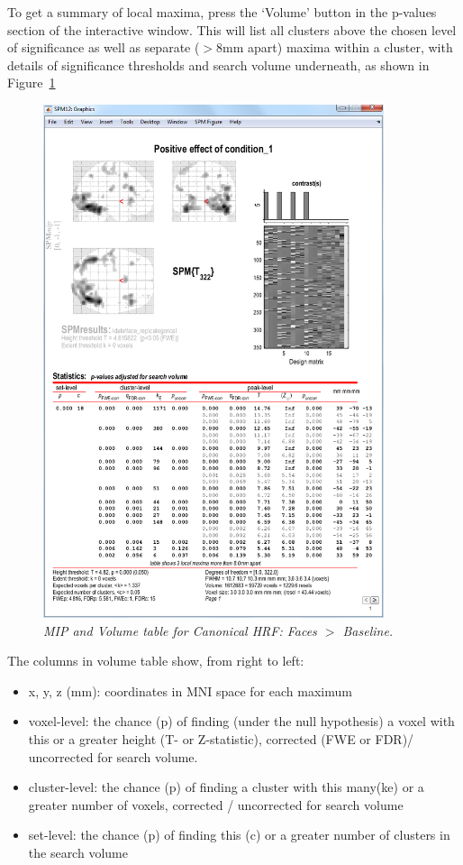 \documentclass[a4paper,titlepage]{book}
\newcommand{\bi}{\begin{itemize}}
\newcommand{\ei}{\end{itemize}}
\begin{document}
To get a summary of local maxima, press the `Volume' button in the 
p-values section of the interactive window. This will list all clusters above the chosen level of significance as well as separate ($>$8mm apart) maxima within a cluster, with details of significance thresholds and search volume underneath, as shown in Figure~\ref{cat5_volume}
\begin{figure}
\begin{center}
\includegraphics[width=100mm]{faces/cat5_volume}
\caption{\em MIP and Volume table for Canonical HRF: Faces  $>$ Baseline. \label{cat5_volume} }
\end{center}
\end{figure}
The columns in volume table show, from right to left:
\bi
\item{x, y, z (mm): coordinates in MNI space for each maximum}
\item{voxel-level: the chance (p) of finding (under the null hypothesis) a voxel with this or a greater height (T- or Z-statistic), corrected (FWE or FDR)/ uncorrected for search volume.}
\item{cluster-level: the chance (p) of finding a cluster with this many(ke) or a greater number of voxels, corrected / uncorrected for search volume}
\item{set-level: the chance (p) of finding this (c) or a greater number of clusters in the search volume}
\ei
\end{document}
